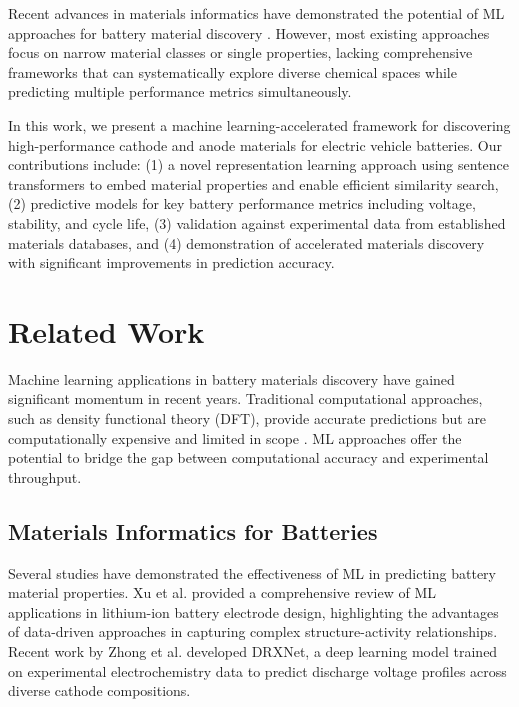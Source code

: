 \documentclass{article}
\begin{document}
Recent advances in materials informatics have demonstrated the potential of ML approaches for battery material discovery \cite{zhong2024deep, moses2025zinc}. However, most existing approaches focus on narrow material classes or single properties, lacking comprehensive frameworks that can systematically explore diverse chemical spaces while predicting multiple performance metrics simultaneously.

In this work, we present a machine learning-accelerated framework for discovering high-performance cathode and anode materials for electric vehicle batteries. Our contributions include: (1) a novel representation learning approach using sentence transformers to embed material properties and enable efficient similarity search, (2) predictive models for key battery performance metrics including voltage, stability, and cycle life, (3) validation against experimental data from established materials databases, and (4) demonstration of accelerated materials discovery with significant improvements in prediction accuracy.

\section{Related Work}

Machine learning applications in battery materials discovery have gained significant momentum in recent years. Traditional computational approaches, such as density functional theory (DFT), provide accurate predictions but are computationally expensive and limited in scope \cite{perera2024progress}. ML approaches offer the potential to bridge the gap between computational accuracy and experimental throughput.

\subsection{Materials Informatics for Batteries}

Several studies have demonstrated the effectiveness of ML in predicting battery material properties. Xu et al. \cite{xu2024ml} provided a comprehensive review of ML applications in lithium-ion battery electrode design, highlighting the advantages of data-driven approaches in capturing complex structure-activity relationships. Recent work by Zhong et al. \cite{zhong2024deep} developed DRXNet, a deep learning model trained on experimental electrochemistry data to predict discharge voltage profiles across diverse cathode compositions.
\end{document}
